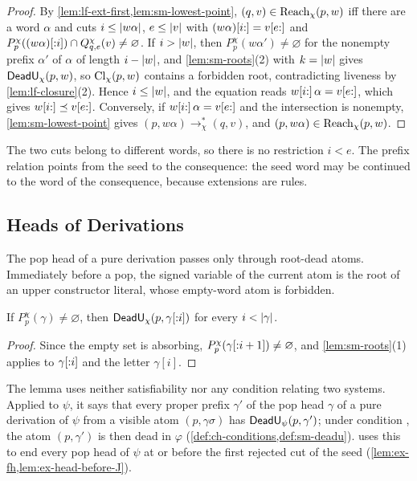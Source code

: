 \begin{proof}
By \cref{lem:lf-ext-first,lem:sm-lowest-point}, $(q,v)\in \operatorname{Reach}_\chi(p,w)$ iff
there are a word $\alpha$ and cuts $i\le\lvert w\alpha\rvert$, $e\le\lvert v\rvert$ with
$(w\alpha)[i{:}]=v[e{:}]$ and
$P^\chi_p((w\alpha)[{:}i])\cap Q^\chi_{q,e}(v)\ne\varnothing$. If
$i>\lvert w\rvert$, then $P^\chi_p(w\alpha')\ne\varnothing$ for the nonempty prefix
$\alpha'$ of $\alpha$ of length $i-\lvert w\rvert$, and \cref{lem:sm-roots}(2) with
$k=\lvert w\rvert$ gives $\mathsf{DeadU}_\chi(p,w)$, so $\operatorname{Cl}_\chi(p,w)$ contains a forbidden
root, contradicting liveness by \cref{lem:lf-closure}(2). Hence $i\le\lvert w\rvert$,
and the equation reads $w[i{:}]\,\alpha=v[e{:}]$, which gives
$w[i{:}]\preceq v[e{:}]$. Conversely, if $w[i{:}]\,\alpha=v[e{:}]$ and the
intersection is nonempty, \cref{lem:sm-lowest-point} gives
$(p,w\alpha)\to^*_\chi(q,v)$, and $(p,w\alpha)\in \operatorname{Reach}_\chi(p,w)$.
\end{proof}

The two cuts belong to different words, so there is no restriction $i<e$.
The prefix relation points from the seed to the consequence: the seed word may
be continued to the word of the consequence, because extensions are rules.

\subsection{Heads of Derivations}\label{sec:sm-heads}

The pop head of a pure derivation passes only through root-dead atoms.
Immediately before a pop, the signed variable of the current atom is the root
of an upper constructor literal, whose empty-word atom is forbidden.

\begin{lemma}\label{lem:sm-head-prefix}
If $P^\chi_p(\gamma)\ne\varnothing$, then $\mathsf{DeadU}_\chi(p,\gamma[{:}i])$ for
every $i<\lvert \gamma\rvert$.
\end{lemma}

\begin{proof}
Since the empty set is absorbing, $P^\chi_p(\gamma[{:}i+1])\ne\varnothing$,
and \cref{lem:sm-roots}(1) applies to $\gamma[{:}i]$ and the letter
$\gamma[i]$.
\end{proof}

The lemma uses neither satisfiability nor any condition relating two systems.
Applied to $\psi$, it says that every proper prefix $\gamma'$ of the pop head
$\gamma$ of a pure derivation of $\psi$ from a visible atom $(p,\gamma\sigma)$
has $\mathsf{DeadU}_\psi(p,\gamma')$; under condition \CondU, the atom $(p,\gamma')$ is
then dead in $\varphi$ (\cref{def:ch-conditions,def:sm-deadu}). 
uses this to end every pop head of $\psi$ at or before the first rejected cut
of the seed (\cref{lem:ex-fh,lem:ex-head-before-J}).


